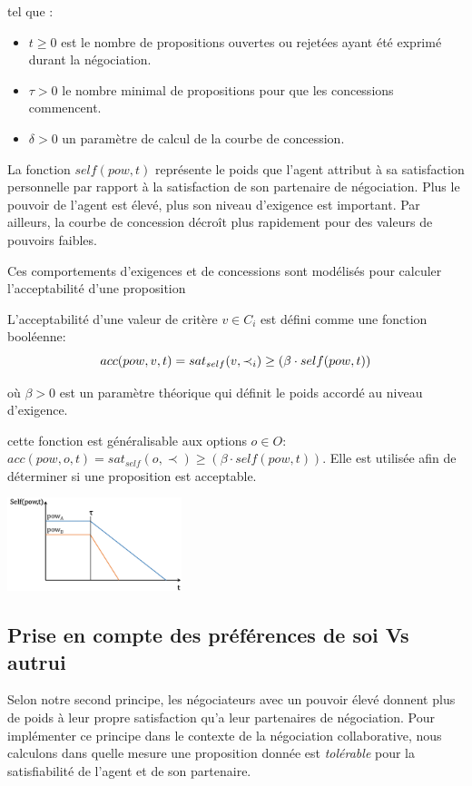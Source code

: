			
		
		tel que :
		\begin{itemize}
			\item $t \geq 0$ est le nombre de propositions ouvertes ou rejetées ayant été exprimé durant la négociation.
			\item $\tau > 0$ le nombre minimal de propositions pour que les concessions commencent.
			\item  $\delta > 0$ un paramètre de calcul de la courbe de concession.
			
		\end{itemize}  
		
		La fonction $self(pow,t)$ représente le poids que l'agent attribut à sa satisfaction personnelle par rapport à la satisfaction de son partenaire de négociation. Plus le pouvoir de l'agent est élevé, plus son niveau d'exigence est important. Par ailleurs, la courbe de concession décroît plus rapidement pour des valeurs de pouvoirs faibles.
		
		Ces comportements d'exigences et de concessions sont modélisés pour calculer l'acceptabilité d'une proposition 
		
		L'acceptabilité d'une valeur de critère $v \in C_i$ est défini comme une fonction booléenne:
		\begin{equation}
		\vspace{-.5em} 
		acc(pow,v, t) = sat_{self}(v, \prec_i) \geq  (\beta \cdot self(pow,t))
		\end{equation}
		
		\medskip
		où $\beta>0$ est un paramètre théorique qui définit le poids accordé au niveau d'exigence.
		
		cette fonction est généralisable aux options $o \in O$: $acc(pow,o, t) = sat_{self}(o, \prec) \geq  (\beta \cdot self(pow,t))$. Elle est utilisée afin de déterminer si une proposition est acceptable.
		
		\begin{floatingfigure}[l]{2.1 in}
			\includegraphics[width=2in]{Figures/sv3.png}
			\caption{\label{fig:conc}Courbe de concession reprenant le principe 1}
		\end{floatingfigure} 
		
		
		\subsection {Prise en compte des préférences de soi Vs autrui}
		Selon notre second principe, les négociateurs avec un pouvoir élevé donnent plus de poids à leur propre satisfaction qu'a leur partenaires de négociation. 
		Pour implémenter ce principe dans le contexte de la négociation collaborative, nous calculons dans quelle mesure une proposition donnée est \emph{tolérable} pour la satisfiabilité de l'agent et de son partenaire.
	
